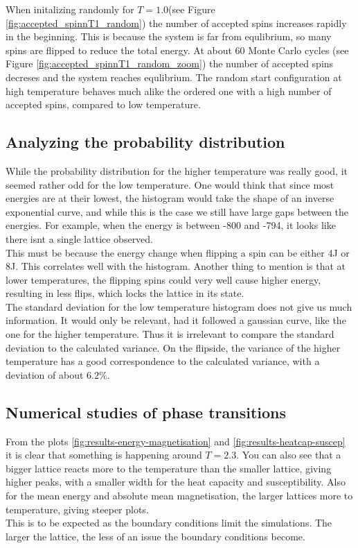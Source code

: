 \documentclass[../main.tex]{subfiles}
\begin{document}
When initalizing randomly for $T = 1.0$(see Figure \ref{fig:accepted_spinnT1_random}) the number of accepted spins increases rapidly in the beginning. This is because the system is far from equlibrium, so many spins are flipped to reduce the total energy. At about 60 Monte Carlo cycles (see Figure \ref{fig:accepted_spinnT1_random_zoom}) the number of accepted spins decreses and the system reaches equlibrium. The random start configuration at high temperature behaves much alike the ordered one with a high number of accepted spins, compared to low temperature.
\subsection{Analyzing the probability distribution}
While the probability distribution for the higher temperature was really good, it seemed rather odd for the low temperature. One would think that since most energies are at their lowest, the histogram would take the shape of an inverse exponential curve, and while this is the case we still have large gaps between the energies. For example, when the energy is between -800 and -794, it looks like there isnt a single lattice observed. \\
This must be because the energy change when flipping a spin can be either 4J or 8J. This correlates well with the histogram. Another thing to mention is that at lower temperatures, the flipping spins could very well cause higher energy, resulting in less flips, which locks the lattice in its state. \\
The standard deviation for the low temperature histogram does not give us much information. It would only be relevant, had it followed a gaussian curve, like the one for the higher temperature. Thus it is irrelevant to compare the standard deviation to the calculated variance. On the flipside, the variance of the higher temperature has a good correspondence to the calculated variance, with a deviation of about $6.2\%$.

\subsection{Numerical studies of phase transitions}
From the plots \ref{fig:results-energy-magnetisation} and \ref{fig:results-heatcap-suscep} it is clear that something is happening around $T = 2.3$. You can also see that a bigger lattice reacts more to the temperature than the smaller lattice, giving higher peaks, with a smaller width for the heat capacity and susceptibility. Also for the mean energy and absolute mean magnetisation, the larger lattices  more to temperature, giving steeper plots.\\
This is to be expected as the boundary conditions limit the simulations. The larger the lattice, the less of an issue the boundary conditions become.
\end{document}
